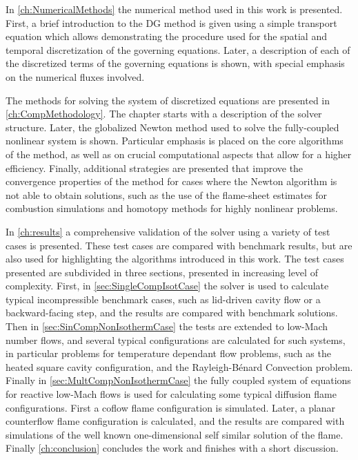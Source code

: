 In \cref{ch:NumericalMethods} the numerical method used in this work is presented. First, a brief introduction to the DG method is given using a simple transport equation which allows demonstrating the procedure used for the spatial and temporal discretization of the governing equations. Later, a description of each of the discretized terms of the governing equations is shown, with special emphasis on the numerical fluxes involved.

The methods for solving the system of discretized equations are presented in \cref{ch:CompMethodology}. The chapter starts with a description of the solver structure. Later, the globalized Newton method used to solve the fully-coupled nonlinear system is shown. Particular emphasis is placed on the core algorithms of the method, as well as on crucial computational aspects that allow for a higher efficiency. Finally, additional strategies are presented that improve the convergence properties of the method for cases where the Newton algorithm is not able to obtain solutions, such as the use of the flame-sheet estimates for combustion simulations and homotopy methods for highly nonlinear problems.

In \cref{ch:results} a comprehensive validation of the solver using a variety of test cases is presented. These test cases are compared with benchmark results, but are also used for highlighting the algorithms introduced in this work. The test cases presented are subdivided in three sections, presented in increasing level of complexity. First, in \cref{sec:SingleCompIsotCase} the solver is used to calculate typical incompressible benchmark cases, such as lid-driven cavity flow or a backward-facing step, and the results are compared with benchmark solutions. Then in \cref{sec:SinCompNonIsothermCase} the tests are extended to low-Mach number flows, and several typical configurations are calculated for such systems, in particular problems for temperature dependant flow problems, such as the heated square cavity configuration, and the Rayleigh-Bénard Convection problem.
Finally in \cref{sec:MultCompNonIsothermCase} the fully coupled system of equations for reactive low-Mach flows is used for calculating some typical diffusion flame configurations. First a coflow flame configuration is simulated. Later, a planar counterflow flame configuration is calculated, and the results are compared with simulations of the well known one-dimensional self similar solution of the flame. Finally \cref{ch:conclusion} concludes the work and finishes with a short discussion.

